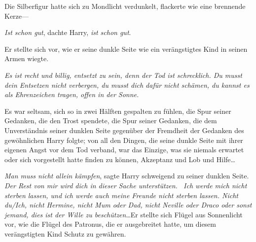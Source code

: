 Die Silberfigur hatte sich zu Mondlicht verdunkelt, flackerte wie eine brennende Kerze—

\emph{Ist schon gut}, dachte Harry, \emph{ist schon gut}.

Er stellte sich vor, wie er seine dunkle Seite wie ein verängstigtes Kind in seinen Armen wiegte.

\emph{Es ist recht und billig, entsetzt zu sein, denn der Tod ist schrecklich. Du musst dein Entsetzen nicht verbergen, du musst dich dafür nicht schämen, du kannst es als Ehrenzeichen tragen, offen in der Sonne.}

Es war seltsam, sich so in zwei Hälften gespalten zu fühlen, die Spur seiner Gedanken, die den Trost spendete, die Spur seiner Gedanken, die dem Unverständnis seiner dunklen Seite gegenüber der Fremdheit der Gedanken des gewöhnlichen Harry folgte; von all den Dingen, die seine dunkle Seite mit ihrer eigenen Angst vor dem Tod verband, war das Einzige, was sie niemals erwartet oder sich vorgestellt hatte finden zu können, Akzeptanz und Lob und Hilfe…

\emph{Man muss nicht allein kämpfen}, sagte Harry schweigend zu seiner dunklen Seite. \emph{Der Rest von mir wird dich in dieser Sache unterstützen. ~Ich werde mich nicht sterben lassen, und ich werde auch meine Freunde nicht sterben lassen. Nicht du/Ich, nicht Hermine, nicht Mum oder Dad, nicht Neville oder Draco oder sonst jemand, dies ist der Wille zu beschützen}…Er stellte sich Flügel aus Sonnenlicht vor, wie die Flügel des Patronus, die er ausgebreitet hatte, um diesem verängstigten Kind Schutz zu gewähren.

